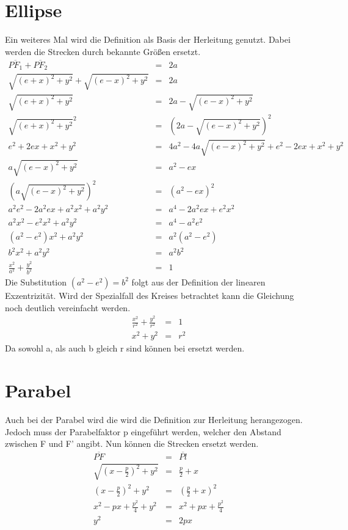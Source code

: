 \section{Ellipse}
Ein weiteres Mal wird die Definition als Basis der Herleitung genutzt. Dabei werden die Strecken durch bekannte Größen ersetzt.
\begin{displaymath}
	\begin{array}{rcl}
		\overline{{PF}_1} + \overline{{PF}_2}  & = & 2a\\
		\sqrt{{(e+x)}^2 + y^2} + \sqrt{{(e-x)}^2 + y^2} & = & 2a\\
		\sqrt{{(e+x)}^2 + y^2} & = & 2a - \sqrt{{(e-x)}^2 + y^2}\\
		\sqrt{{(e+x)}^2 + y^2}^2 & = & \left (2a - \sqrt{{(e-x)}^2 + y^2}\right )^2\\
		e^2 + 2ex + x^2 + y^2 & = & 4a^2 - 4a \sqrt{(e-x)^2+y^2} + e^2 - 2ex + x^2 + y^2\\
		a\sqrt{{(e-x)}^2 + y^2} & = & a^2 - ex\\
		\left (a\sqrt{{(e-x)}^2 + y^2}\right )^2 & = & (a^2 - ex)^2\\
		a^2e^2 - 2a^2ex + a^2x^2 + a^2y^2 &=& a^4 - 2a^2ex + e^2x^2\\
		a^2x^2 - e^2x^2 + a^2y^2 &=& a^4 - a^2e^2\\
		\left(a^2 - e^2\right)x^2 + a^2y^2 &=& a^2\left(a^2 - e^2\right)\\
		b^2x^2 + a^2y^2 &=& a^2b^2\\
		\frac{x^2}{a^2} + \frac{y^2}{b^2} &=& 1
	\end{array}
\end{displaymath}
Die Substitution $\left(a^2 - e^2\right) = b^2$ folgt aus der Definition der linearen Exzentrizität. Wird der Spezialfall des Kreises betrachtet kann die Gleichung noch deutlich vereinfacht werden.
\begin{displaymath}
	\begin{array}{rcl}
		\frac{x^2}{r^2} + \frac{y^2}{r^2} &=& 1\\
		x^2 + y^2 &=& r^2
	\end{array}
\end{displaymath}
Da sowohl a, als auch b gleich r sind können bei ersetzt werden. 
\section{Parabel}
Auch bei der Parabel wird die wird die Definition zur Herleitung herangezogen. Jedoch muss der Parabelfaktor p eingeführt werden, welcher den Abstand zwischen F und F' angibt. Nun können die Strecken ersetzt werden.
\begin{displaymath}
	\begin{array}{rcl}
		\overline{PF} &=& \overline{Pl}\\
		\sqrt{\left(x-\frac{p}{2}\right)^2+y^2} &=& \frac{p}{2} + x\\
		\left(x-\frac{p}{2}\right)^2+y^2 &=& \left(\frac{p}{2} + x\right)^2\\
		x^2 - px + \frac{p^2}{4} + y^2 &=& x^2 + px + \frac{p^2}{4}\\
		y^2 &=& 2px
	\end{array}
\end{displaymath}
